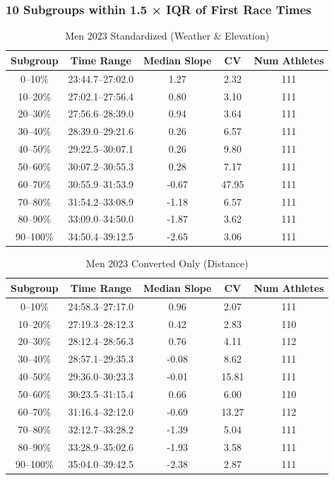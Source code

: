 \documentclass[suppldata]{interact}
\theoremstyle{plain}%
\theoremstyle{definition}
\theoremstyle{remark}
\begin{document}
\subsubsection*{10 Subgroups within 1.5 × IQR of First Race Times}

\begin{table}[htbp]
\renewcommand{\arraystretch}{1.1}
\begin{tabular}{c c c c c}
\toprule
Subgroup& Time Range & Median Slope& CV& Num Athletes \\
\midrule
0--10\%   & 23:44.7--27:02.0 &  1.27 & 2.32  & 111 \\
    10--20\%  & 27:02.1--27:56.4 &  0.80 & 3.10  & 111 \\
    20--30\%  & 27:56.6--28:39.0 &  0.94 & 3.64  & 111 \\
    30--40\%  & 28:39.0--29:21.6 &  0.26 & 6.57  & 111 \\
    40--50\%  & 29:22.5--30:07.1 &  0.26 & 9.80  & 111 \\
    50--60\%  & 30:07.2--30:55.3 &  0.28 & 7.17  & 111 \\
    60--70\%  & 30:55.9--31:53.9 & -0.67 & 47.95 & 111 \\
    70--80\%  & 31:54.2--33:08.9 & -1.18 & 6.57  & 111 \\
    80--90\%  & 33:09.0--34:50.0 & -1.87 & 3.62  & 111 \\
    90--100\% & 34:50.4--39:12.5 & -2.65 & 3.06  & 111 \\
\bottomrule
\end{tabular}
\centering
\caption{Men 2023 Standardized (Weather \& Elevation)}
\label{tab:2023_stand}
\end{table}

\begin{table}[htbp]
\renewcommand{\arraystretch}{1.1}
\begin{tabular}{c c c c c}
\toprule
Subgroup& Time Range & Median Slope & CV& Num Athletes \\
\midrule
0--10\%   & 24:58.3--27:17.0 &  0.96 & 2.07  & 111 \\
    10--20\%  & 27:19.3--28:12.3 &  0.42 & 2.83  & 110 \\
    20--30\%  & 28:12.4--28:56.3 &  0.76 & 4.11  & 112 \\
    30--40\%  & 28:57.1--29:35.3 & -0.08 & 8.62  & 111 \\
    40--50\%  & 29:36.0--30:23.3 & -0.01 & 15.81 & 111 \\
    50--60\%  & 30:23.5--31:15.4 &  0.66 & 6.00  & 110 \\
    60--70\%  & 31:16.4--32:12.0 & -0.69 & 13.27 & 112 \\
    70--80\%  & 32:12.7--33:28.2 & -1.39 & 5.04  & 111 \\
    80--90\%  & 33:28.9--35:02.6 & -1.93 & 3.58  & 111 \\
    90--100\% & 35:04.0--39:42.5 & -2.38 & 2.87  & 111 \\
\bottomrule
\end{tabular}
\centering
\caption{Men 2023 Converted Only (Distance)}
\label{tab:2023_converted}
\end{table}
\end{document}
